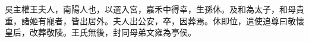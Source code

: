 \begin{pinyinscope}
 
 
 吳主權王夫人，南陽人也，以選入宮，嘉禾中得幸，生孫休。及和為太子，和母貴重，諸姬有寵者，皆出居外。夫人出公安，卒，因葬焉。休即位，遣使追尊曰敬懷皇后，改葬敬陵。王氏無後，封同母弟文雍為亭侯。
 
 
\end{pinyinscope}